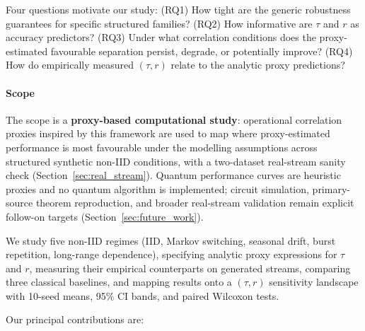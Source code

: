 \documentclass[preprint,12pt,authoryear]{elsarticle}
\begin{document}
Four questions motivate our study: (RQ1) How tight are the generic robustness guarantees for specific structured families? (RQ2) How informative are $\tau$ and $r$ as accuracy predictors? (RQ3) Under what correlation conditions does the proxy-estimated favourable separation persist, degrade, or potentially improve? (RQ4) How do empirically measured $(\tau, r)$ relate to the analytic proxy predictions?

\paragraph{Scope} The scope is a \textbf{proxy-based computational study}: operational correlation proxies inspired by this framework are used to map where proxy-estimated performance is most favourable under the modelling assumptions across structured synthetic non\nobreakdash-IID conditions, with a two\nobreakdash-dataset real-stream sanity check (Section~\ref{sec:real_stream}). Quantum performance curves are heuristic proxies and no quantum algorithm is implemented; circuit simulation, primary-source theorem reproduction, and broader real-stream validation remain explicit follow-on targets (Section~\ref{sec:future_work}).

We study five non\nobreakdash-IID regimes (IID, Markov switching, seasonal drift, burst repetition, long-range dependence), specifying analytic proxy expressions for $\tau$ and $r$, measuring their empirical counterparts on generated streams, comparing three classical baselines, and mapping results onto a $(\tau, r)$ sensitivity landscape with 10-seed means, 95\% CI bands, and paired Wilcoxon tests.

Our principal contributions are:
\end{document}
